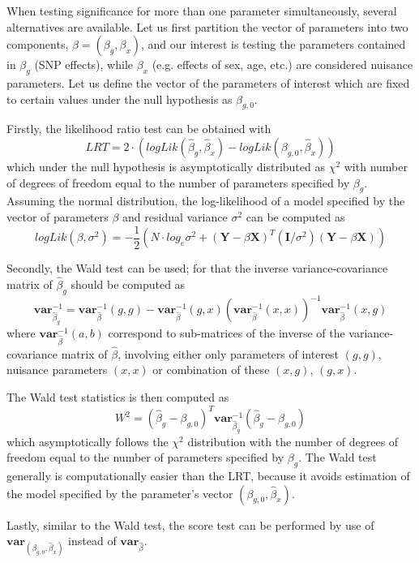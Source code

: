 \documentclass[12pt]{article}
\begin{document}
When testing significance for more than one parameter simultaneously, 
several alternatives are available. Let us first partition the vector of 
parameters into two components, $\beta = (\beta_g,\beta_x)$, and our 
interest is testing the parameters contained in $\beta_g$ (SNP effects), 
while $\beta_x$ (e.g. effects of sex, age, etc.) are considered nuisance 
parameters. Let us define the vector of the parameters of interest 
which are fixed to certain values under the null hypothesis as $\beta_{g,0}$. 

Firstly, the likelihood ratio test can be obtained with
$$
LRT = 2 \cdot (logLik(\hat{\beta}_g,\hat{\beta}_x) - logLik(\beta_{g,0},\hat{\beta}_x))
$$
which under the null hypothesis is asymptotically distributed as $\chi^2$ with 
number of degrees of freedom equal to the number of parameters specified 
by $\beta_g$. Assuming the normal distribution, the log-likelihood of a 
model specified by the vector of parameters $\beta$ and residual variance 
$\sigma^2$ can be computed as
$$
logLik(\beta,\sigma^2) = 
-\frac{1}{2} ( N \cdot log_e \sigma^2 +
(\mathbf{Y} - \beta \mathbf{X})^T (\mathbf{I}/\sigma^2) (\mathbf{Y} - \beta \mathbf{X}) )
$$

Secondly, the Wald test can be used; for that the inverse variance-covariance
matrix of $\hat{\beta}_g$ should be computed as 
$$
\mathbf{var}_{\hat{\beta}_g}^{-1} = \mathbf{var}_{\hat{\beta}}^{-1}(g,g) - 
\mathbf{var}_{\hat{\beta}}^{-1}(g,x) (\mathbf{var}_{\hat{\beta}}^{-1}(x,x))^{-1} \mathbf{var}_{\hat{\beta}}^{-1}(x,g)
$$
where $\mathbf{var}_{\hat{\beta}}^{-1}(a,b)$ correspond to sub-matrices of the inverse of the 
variance-covariance matrix of $\hat{\beta}$, involving either only parameters of interest 
$(g,g)$, nuisance parameters $(x,x)$ or combination of these $(x,g)$, $(g,x)$.

The Wald test statistics is then computed as 
$$
W^2 = (\hat{\beta}_g - \beta_{g,0})^T \mathbf{var}_{\hat{\beta}_g}^{-1} (\hat{\beta}_g - \beta_{g,0})
$$
which asymptotically follows the $\chi^2$ distribution with the number of degrees 
of freedom equal to the number of parameters specified by $\beta_g$. The Wald test generally 
is computationally easier than the LRT, because it avoids estimation of the model 
specified by the parameter's vector $(\beta_{g,0},\hat{\beta}_x)$.

Lastly, similar to the Wald test, the score test can be performed by use 
of $\mathbf{var}_{(\beta_{g,0},\hat{\beta}_x)}$ instead of $\mathbf{var}_{\hat{\beta}}$.

\end{document}
